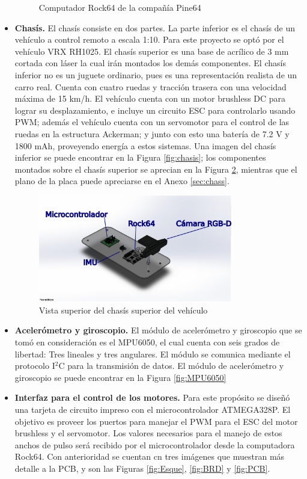 \begin{itemize}
\begin{figure}[htbp!]
		\caption{Computador Rock64 de la compañía Pine64}
		\label{fig:Rock64}
	\end{figure} 
	\item {\bf Chasís.} El chasís consiste en dos partes. La parte inferior es el chasís de un vehículo a control remoto a escala 1:10. Para este proyecto se optó por el vehículo VRX RH1025. El chasís superior es una base de acrílico de 3 mm cortada con láser la cual irán montados los demás componentes. El chasís inferior no es un juguete ordinario, pues es una representación realista de un carro real. Cuenta con cuatro ruedas y tracción trasera con una velocidad máxima de 15 km/h. El vehículo cuenta con un motor brushless DC para lograr su desplazamiento, e incluye un circuito ESC para controlarlo usando PWM; además el vehículo cuenta con un servomotor para el control de las ruedas en la estructura Ackerman; y junto con esto una batería de 7.2 V y 1800 mAh, proveyendo energía a estos sistemas. Una imagen del chasís inferior se puede encontrar en la Figura \ref{fig:chasis}; los componentes montados sobre el chasís superior se aprecian en la Figura \ref{fig:chas}, mientras que el plano de la placa puede apreciarse en el Anexo \ref{sec:chass}.
	\begin{figure}[htbp!]
		\centering
		\includegraphics[width=0.8\textwidth]{./Figuras/PlacaEns}
		\caption{Vista superior del chasís superior del vehículo}
		\label{fig:chas}
	\end{figure}
	\item {\bf Acelerómetro y giroscopio.} El módulo de acelerómetro y giroscopio que se tomó en consideración es el MPU6050, el cual cuenta con seis grados de libertad: Tres lineales y tres angulares. El módulo se comunica mediante el protocolo I$^2$C para la transmisión de datos. El módulo de acelerómetro y giroscopio se puede encontrar en la Figura \ref{fig:MPU6050}
	\item {\bf Interfaz para el control de los motores.} Para este propósito se diseñó una tarjeta de circuito impreso con el microcontrolador ATMEGA328P. El objetivo es proveer los puertos para manejar el PWM para el ESC del motor brushless y el servomotor. Los valores necesarios para el manejo de estos anchos de pulso será recibido por el microcontrolador desde la computadora Rock64. Con anterioridad se cuentan cn tres imágenes que muestran más detalle a la PCB, y son las Figuras \ref{fig:Esque}, \ref{fig:BRD} y \ref{fig:PCB}.

\end{itemize}
